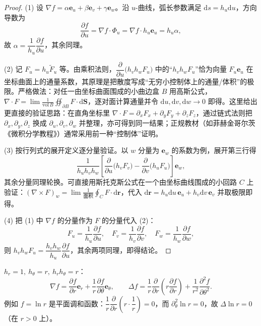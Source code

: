 \begin{proof}
(1) 设 \(\nabla f=\alpha\mathbf e_u+\beta\mathbf e_v+\gamma\mathbf e_w\)。沿 \(u\)-曲线，弧长参数满足 \(\mathrm{d}s=h_u\mathrm{d}u\)，方向导数为
\[
\frac{\partial f}{\partial u}=\nabla f\cdot\Phi_u=\nabla f\cdot h_u\mathbf e_u=h_u\alpha ,
\]
故 \(\alpha=\dfrac1{h_u}\dfrac{\partial f}{\partial u}\)，其余同理。

(2) 记 \(F_u=h_u\tilde F_u\) 等。由乘积法则，\(\dfrac{\partial}{\partial u}\bigl(h_vh_wF_u\bigr)\) 中的“\(h_vh_wF_u\)”恰为向量 \(F_u\mathbf e_u\) 在坐标曲面上的通量系数，其原理是把散度写成“无穷小控制体上的通量/体积”的极限。严格做法：对任一由坐标曲面围成的小曲边盒 \(B\) 用高斯公式，\(\nabla\cdot F=\lim\frac{1}{\mathrm{vol}\,B}\oiint_{\partial B}F\cdot\mathrm{d}\mathbf S\)，逐对面计算通量并令 \(\mathrm{d}u,\mathrm{d}v,\mathrm{d}w\to0\) 即得。这里给出更直接的验证思路：在直角坐标里 \(\nabla\cdot F=\partial_xF_x+\partial_yF_y+\partial_zF_z\)，通过链式法则把 \(\partial_x,\partial_y,\partial_z\) 换成 \(\partial_u,\partial_v,\partial_w\) 并整理，亦可得到同一结果；正规教材（如菲赫金哥尔茨《微积分学教程》）通常采用前一种“控制体”证明。

(3) 按行列式的展开定义逐分量验证。以 \(w\) 分量为 \(\mathbf e_w\) 的系数为例，展开第三行得
\[
\frac{1}{h_uh_vh_w}\left[\frac{\partial}{\partial u}\bigl(h_vF_v\bigr)-\frac{\partial}{\partial v}\bigl(h_uF_u\bigr)\right]\mathbf e_w ,
\]
其余分量同理轮换。可直接用斯托克斯公式在一个由坐标曲线围成的小回路 \(C\) 上验证：\((\nabla\times F)_w=\lim\frac{1}{\text{面积}}\oint_CF\cdot\mathrm{d}\mathbf r\)，代入 \(\mathrm{d}\mathbf r=h_u\mathrm{d}u\,\mathbf e_u+h_v\mathrm{d}v\,\mathbf e_v\) 并取极限即得。

(4) 把 (1) 中 \(\nabla f\) 的分量作为 \(F\) 的分量代入 (2)：
\[
F_u=\frac1{h_u}\frac{\partial f}{\partial u},\quad
F_v=\frac1{h_v}\frac{\partial f}{\partial v},\quad
F_w=\frac1{h_w}\frac{\partial f}{\partial w},
\]
则 \(h_vh_wF_u=\dfrac{h_vh_w}{h_u}\dfrac{\partial f}{\partial u}\)，其余两项同理，即得结论。
\end{proof}

\begin{example}[极坐标下的算子]
\(h_r=1,\ h_\theta=r,\ h_rh_\theta=r\)：
\[
\nabla f=\frac{\partial f}{\partial r}\mathbf e_r+\frac1r\frac{\partial f}{\partial\theta}\mathbf e_\theta,\qquad
\Delta f=\frac1r\frac{\partial}{\partial r}\!\left(r\frac{\partial f}{\partial r}\right)+\frac{1}{r^2}\frac{\partial^2 f}{\partial\theta^2} .
\]
例如 \(f=\ln r\) 是平面调和函数：\(\dfrac1r\dfrac{\partial}{\partial r}\left(r\cdot\dfrac1r\right)=0\)，而 \(\partial_\theta^2\ln r=0\)，故 \(\Delta\ln r=0\)（在 \(r>0\) 上）。
\end{example}

